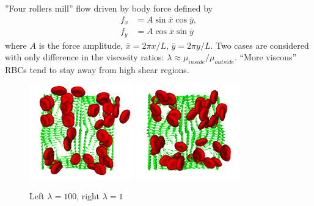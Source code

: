 ''Four rollers mill'' flow driven by body force defined by
\begin{align*}
  f_x &= A \sin \overline{x} \cos \overline{y}, \\
  f_y &= A \cos \overline{x} \sin \overline{y}
\end{align*}
where $A$ is the force amplitude, $\overline{x} = 2 \pi x / L$,
$\overline{y} = 2 \pi y / L$. Two cases are considered with only
difference in the viscosity ratios: $\lambda \approx \mu_{inside} /
\mu_{outside}$. ``More viscous'' RBCs tend to stay away from high
shear regions.

\begin{figure}
\begin{center}
  \includegraphics[width=0.4\textwidth]{i/rbc/a/visit.png}
  \includegraphics[width=0.4\textwidth]{i/rbc/b/visit.png}
  \caption{Left $\lambda = 100$, right $\lambda = 1$}
\end{center}
\end{figure}
